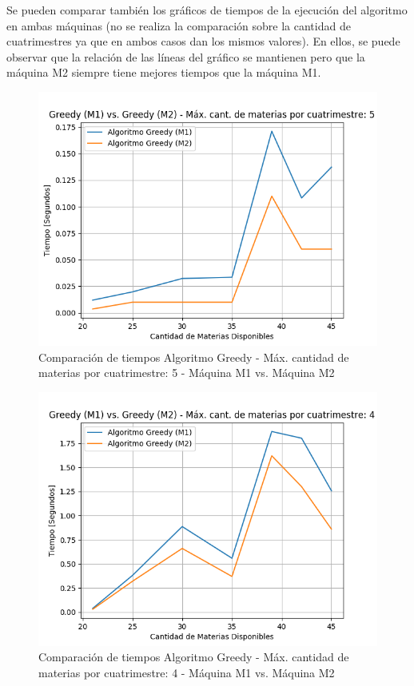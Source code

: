 \documentclass[a4paper]{article}
\begin{document}
Se pueden comparar también los gráficos de tiempos de la ejecución del algoritmo en ambas máquinas (no se realiza la comparación sobre la cantidad de cuatrimestres ya que en ambos casos dan los mismos valores). En ellos, se puede observar que la relación de las líneas del gráfico se mantienen pero que la máquina M2 siempre tiene mejores tiempos que la máquina M1.\newline

\begin{figure}[H]
\centering
\includegraphics[scale=0.65]{Imagenes/m1_vs_m2_GREEDY_max_mat_5.png}\par
\caption{Comparación de tiempos Algoritmo Greedy - Máx. cantidad de materias por cuatrimestre: 5 - Máquina M1 vs. Máquina M2}
\end{figure}

\begin{figure}[H]
\centering
\includegraphics[scale=0.65]{Imagenes/m1_vs_m2_GREEDY_max_mat_4.png}\par
\caption{Comparación de tiempos Algoritmo Greedy - Máx. cantidad de materias por cuatrimestre: 4 - Máquina M1 vs. Máquina M2}
\end{figure}
\end{document}
